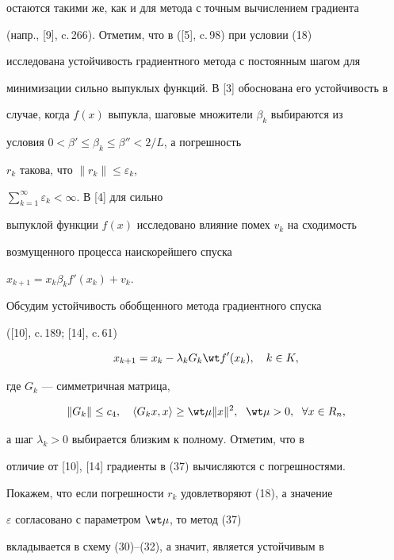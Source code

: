 остаются такими же, как и для метода с точным вычислением градиента


(напр., [9], c.\,266). Отметим, что в ([5], c.\,98) при условии (18)


исследована устойчивость градиентного метода с постоянным шагом для


минимизации сильно выпуклых функций. В [3] обоснована его устойчивость в


случае, когда $f(x)$ выпукла, шаговые множители $\beta_k$ выбираются из


условия $0<{\beta}'\le\beta_k\le {\beta}''<2/L$, а погрешность


$r_k$ такова, что $\|{r_k}\|\le\varepsilon_k$,


$\sum\limits_{k=1}^{\infty}\varepsilon_k<\infty$. В [4] для сильно


выпуклой функции $f(x)$ исследовано влияние помех $v_k$ на сходимость


возмущенного процесса наискорейшего спуска


$x_{k+1}=x_k\beta_k{f}'(x_k)+v_k$.





Обсудим устойчивость обобщенного метода градиентного спуска


([10], c.\,189; [14], c.\,61)


\begin{equation}


x_{k+1}=x_k-\lambda_kG_k{\wt f}'(x_k),\quad k\in K,


\end{equation}


где $G_k$ --- симметричная матрица,


\begin{equation}


\|{G_k}\|\le c_4,\quad\langle {G_kx,x}\rangle\ge\wt\mu\|{x}\|^2,


\ \; \wt\mu >0,\ \; \forall x\in R_n,


\end{equation}


а шаг $\lambda_k>0$ выбирается близким к полному. Отметим, что в


отличие от [10], [14] градиенты в (37) вычисляются с погрешностями.


Покажем, что если погрешности $r_k$ удовлетворяют (18), а значение


$\varepsilon$ согласовано с параметром $\wt\mu $, то метод (37)


вкладывается в схему (30)--(32), а значит, является устойчивым в


